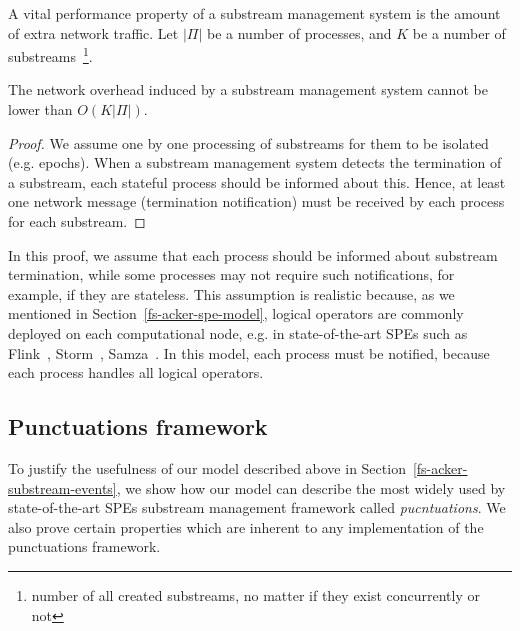 A vital performance property of a substream management system is the amount of extra network traffic. Let $|\Pi|$ be a number of processes, and $K$ be a number of substreams~\footnote{number of all created substreams, no matter if they exist concurrently or not}. 

\begin{lemma}
The network overhead induced by a substream management system cannot be lower than $O(K|\Pi|)$. 
\end{lemma}
\begin{proof}
We assume one by one processing of substreams for them to be isolated (e.g. epochs). When a substream management system detects the termination of a substream, each stateful process should be informed about this. Hence, at least one network message (termination notification) must be received by each process for each substream.
\end{proof}

In this proof, we assume that each process should be informed about substream termination, while some processes may not require such notifications, for example, if they are stateless. This assumption is realistic because, as we mentioned in Section~\ref{fs-acker-spe-model}, logical operators are commonly deployed on each computational node, e.g. in state-of-the-art SPEs such as Flink~\cite{Carbone:2017:SMA:3137765.3137777}, Storm~\cite{apache:storm}, Samza~\cite{Noghabi:2017:SSS:3137765.3137770}. In this model, each process must be notified, because each process handles all logical operators.


\subsection{Punctuations framework}
\label{fs-acker-punctuations}

To justify the usefulness of our model described above in Section~\ref{fs-acker-substream-events}, we show how our model can describe the most widely used by state-of-the-art SPEs substream management framework called {\em pucntuations}. We also prove certain properties which are inherent to any implementation of the punctuations framework. 

